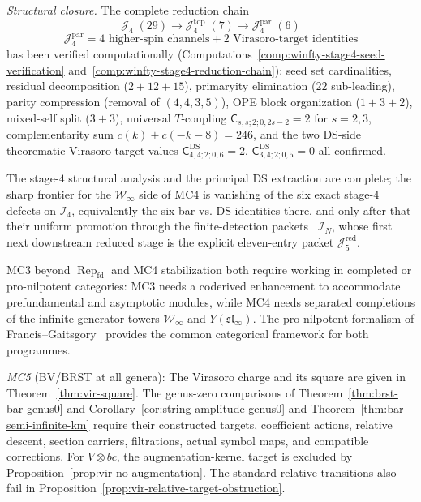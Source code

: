 \begin{remark}
\begin{remark}
\emph{Structural closure.}
The complete reduction chain
\[
\mathcal{J}_4\;(29) \to \mathcal{J}_4^{\mathrm{top}}\;(7)
\to \mathcal{J}_4^{\mathrm{par}}\;(6)
\]
\[
\mathcal{J}_4^{\mathrm{par}}
= 4\text{ higher-spin channels} + 2\text{ Virasoro-target identities}
\]
has been verified computationally
(Computations~\ref{comp:winfty-stage4-seed-verification}
and~\ref{comp:winfty-stage4-reduction-chain}):
seed set cardinalities, residual decomposition ($2+12+15$),
primaryity elimination ($22$ sub-leading), parity compression
(removal of $(4,4,3,5)$), OPE block organization ($1+3+2$),
mixed-self split ($3+3$), universal $T$-coupling
$\mathsf{C}_{s,s;2;0,2s-2}=2$ for $s=2,3$, complementarity sum
$c(k)+c(-k-8)=246$, and the two DS-side
theorematic Virasoro-target values
$\mathsf{C}^{\mathrm{DS}}_{4,4;2;0,6}=2$,
$\mathsf{C}^{\mathrm{DS}}_{3,4;2;0,5}=0$ all confirmed.

The stage-$4$ structural analysis and the principal DS extraction are
complete; the sharp frontier for the $\mathcal{W}_\infty$ side of MC4
is vanishing of the six exact stage-$4$ defects on $\mathcal{I}_4$,
equivalently the six bar-vs.-DS identities there, and only after that
their uniform promotion through the finite-detection packets
~$\mathcal{I}_N$, whose first next downstream reduced stage is the
explicit eleven-entry packet $\mathcal{J}_5^{\mathrm{red}}$.
\end{remark}

\begin{remark}
\label{rem:mc3-mc4-shared-completion}
MC3 beyond $\operatorname{Rep}_{\mathrm{fd}}$ and MC4 stabilization
both require working in completed or pro-nilpotent categories: MC3
needs a coderived enhancement to accommodate prefundamental and
asymptotic modules, while MC4 needs separated completions of the
infinite-generator towers $\mathcal{W}_\infty$ and $Y(\mathfrak{sl}_\infty)$.
The pro-nilpotent formalism of Francis--Gaitsgory~\cite{FG12} provides
the common categorical framework for both programmes.
\end{remark}

\emph{MC5} (BV/BRST at all genera):
The Virasoro charge and its square are given in Theorem~\ref{thm:vir-square}.
The genus-zero comparisons of Theorem~\ref{thm:brst-bar-genus0} and Corollary~\ref{cor:string-amplitude-genus0} and Theorem~\ref{thm:bar-semi-infinite-km} require their constructed targets, coefficient actions, relative descent, section carriers, filtrations, actual symbol maps, and compatible corrections.
For $V\otimes bc$, the augmentation-kernel target is excluded by Proposition~\ref{prop:vir-no-augmentation}.
The standard relative transitions also fail in Proposition~\ref{prop:vir-relative-target-obstruction}.


\end{remark}
